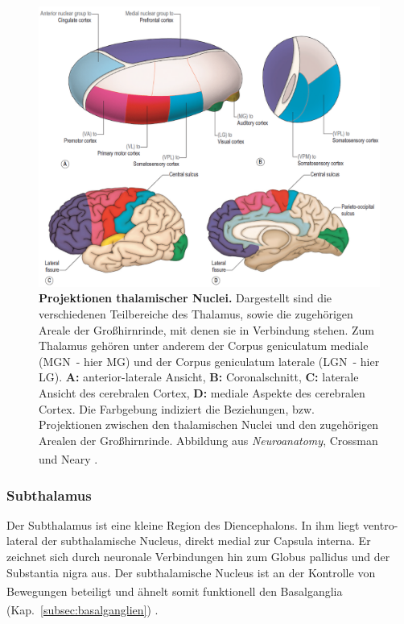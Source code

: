 \documentclass[12pt,a4paper,pdftex]{article}
\begin{document}
\begin{figure}[H]
    \centering
    \includegraphics[width=\textwidth]{pictures/Bilder_Jule/Andere/thalamus.png}
    \caption[Projektionen thalamischer Nuclei]{\textbf{Projektionen thalamischer Nuclei.} Dargestellt sind die verschiedenen Teilbereiche des Thalamus, sowie die zugehörigen Areale der Großhirnrinde, mit denen sie in Verbindung stehen. Zum Thalamus gehören unter anderem der Corpus geniculatum mediale (MGN~- hier MG) und der Corpus geniculatum laterale (LGN~- hier LG). \textbf{A:} anterior-laterale Ansicht, \textbf{B:} Coronalschnitt, \textbf{C:} laterale Ansicht des cerebralen Cortex, \textbf{D:} mediale Aspekte des cerebralen Cortex. Die Farbgebung indiziert die Beziehungen, bzw. Projektionen zwischen den thalamischen Nuclei und den zugehörigen Arealen der Großhirnrinde. Abbildung aus \textit{Neuroanatomy}, Crossman und Neary \textsuperscript{\cite[12]{crossman2014neuroanatomy}}.}
    \label{fig:thalamus_nuclei}
\end{figure}

\subsubsection{Subthalamus} 

Der Subthalamus ist eine kleine Region des Diencephalons. In ihm liegt ventro-lateral der subthalamische Nucleus, direkt medial zur Capsula interna. Er zeichnet sich durch neuronale Verbindungen hin zum Globus pallidus und der Substantia nigra aus. Der subthalamische Nucleus ist an der Kontrolle von Bewegungen beteiligt \textsuperscript{\cite[12]{crossman2014neuroanatomy}} und ähnelt somit funktionell den Basalganglia (Kap.~\ref{subsec:basalganglien}) \textsuperscript{\cite[16]{crossman2014neuroanatomy}}.
\end{document}
